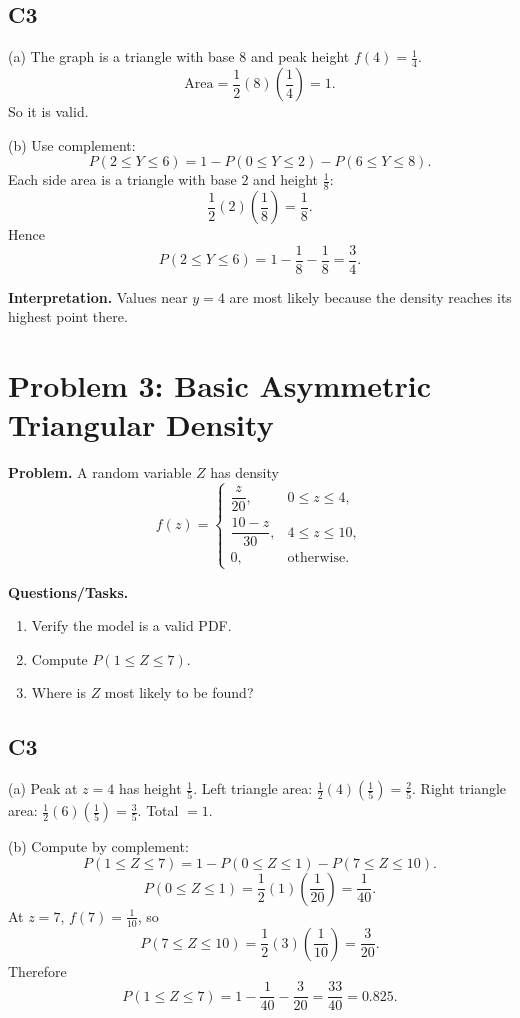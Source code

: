 \subsection*{C3}
(a) The graph is a triangle with base $8$ and peak height $f(4)=\frac14$.
\[
\text{Area}=\frac12(8)\left(\frac14\right)=1.
\]
So it is valid.

(b) Use complement:
\[
P(2\le Y\le 6)=1-P(0\le Y\le 2)-P(6\le Y\le 8).
\]
Each side area is a triangle with base $2$ and height $\frac18$:
\[
\frac12(2)\left(\frac18\right)=\frac18.
\]
Hence
\[
P(2\le Y\le 6)=1-\frac18-\frac18=\frac34.
\]

\textbf{Interpretation.}
Values near $y=4$ are most likely because the density reaches its highest point there.

\section{Problem 3: Basic Asymmetric Triangular Density}

\textbf{Problem.}
A random variable $Z$ has density
\[
f(z)=\begin{cases}
\dfrac{z}{20}, & 0\le z\le 4,\\
\dfrac{10-z}{30}, & 4\le z\le 10,\\
0, & \text{otherwise.}
\end{cases}
\]

\textbf{Questions/Tasks.}
\begin{enumerate}
\item Verify the model is a valid PDF.
\item Compute $P(1\le Z\le 7)$.
\item Where is $Z$ most likely to be found?
\end{enumerate}

\subsection*{C3}
(a) Peak at $z=4$ has height $\frac15$.
Left triangle area: $\frac12(4)(\frac15)=\frac25$.
Right triangle area: $\frac12(6)(\frac15)=\frac35$.
Total $=1$.

(b) Compute by complement:
\[
P(1\le Z\le 7)=1-P(0\le Z\le 1)-P(7\le Z\le 10).
\]
\[
P(0\le Z\le 1)=\frac12(1)\left(\frac1{20}\right)=\frac1{40}.
\]
At $z=7$, $f(7)=\frac{1}{10}$, so
\[
P(7\le Z\le 10)=\frac12(3)\left(\frac{1}{10}\right)=\frac{3}{20}.
\]
Therefore
\[
P(1\le Z\le 7)=1-\frac1{40}-\frac3{20}=\frac{33}{40}=0.825.
\]


